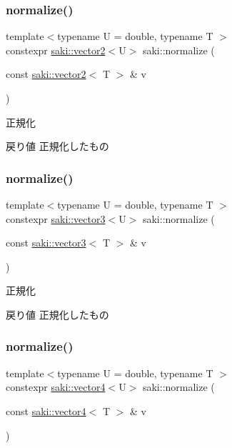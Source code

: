 \subsubsection{\texorpdfstring{normalize()}{normalize()}\hspace{0.1cm}{\footnotesize\ttfamily [1/3]}}
{\footnotesize\ttfamily template$<$typename U  = double, typename T $>$ \\
constexpr \mbox{\hyperlink{classsaki_1_1vector2}{saki\+::vector2}}$<$U$>$ saki\+::normalize (\begin{DoxyParamCaption}\item[{const \mbox{\hyperlink{classsaki_1_1vector2}{saki\+::vector2}}$<$ T $>$ \&}]{v }\end{DoxyParamCaption})}



正規化 

\begin{DoxyReturn}{戻り値}
正規化したもの 
\end{DoxyReturn}
\mbox{\label{namespacesaki_aa38ed490dc1e7d5df7241eefd1c9453b}} 
\subsubsection{\texorpdfstring{normalize()}{normalize()}\hspace{0.1cm}{\footnotesize\ttfamily [2/3]}}
{\footnotesize\ttfamily template$<$typename U  = double, typename T $>$ \\
constexpr \mbox{\hyperlink{classsaki_1_1vector3}{saki\+::vector3}}$<$U$>$ saki\+::normalize (\begin{DoxyParamCaption}\item[{const \mbox{\hyperlink{classsaki_1_1vector3}{saki\+::vector3}}$<$ T $>$ \&}]{v }\end{DoxyParamCaption})}



正規化 

\begin{DoxyReturn}{戻り値}
正規化したもの 
\end{DoxyReturn}
\mbox{\label{namespacesaki_afcef74d7e32ef8cf446d075beeed4b41}} 
\subsubsection{\texorpdfstring{normalize()}{normalize()}\hspace{0.1cm}{\footnotesize\ttfamily [3/3]}}
{\footnotesize\ttfamily template$<$typename U  = double, typename T $>$ \\
constexpr \mbox{\hyperlink{classsaki_1_1vector4}{saki\+::vector4}}$<$U$>$ saki\+::normalize (\begin{DoxyParamCaption}\item[{const \mbox{\hyperlink{classsaki_1_1vector4}{saki\+::vector4}}$<$ T $>$ \&}]{v }\end{DoxyParamCaption})}



